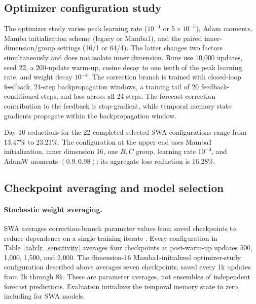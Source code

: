 \documentclass{article}
\begin{document}
\subsection{\texorpdfstring{{Optimizer configuration study}}{Optimizer configuration study}}
\label{app:optimizer_study}
The optimizer study varies peak learning rate ($10^{-4}$ or $5\times10^{-5}$), Adam moments, Mamba initialization scheme (legacy or Mamba1), and the paired inner-dimension/group settings (16/1 or 64/4). The latter changes two factors simultaneously and does not isolate inner dimension. Runs use 10,000 updates, seed 22, a 200-update warm-up, cosine decay to one tenth of the peak learning rate, and weight decay $10^{-4}$. {The correction branch is trained} with closed-loop feedback, 24-step backpropagation windows, a training tail of 20 feedback-conditioned steps, and loss across all 24 steps. {The forecast correction contribution to the feedback} is stop-gradient, while temporal memory state gradients propagate within the backpropagation window.

Day-10 reductions for the 22 completed selected SWA configurations range from $13.47\%$ to $23.21\%$. The configuration at the upper end uses Mamba1 initialization, inner dimension 16, one $B,C$ group, learning rate $10^{-4}$, and AdamW moments $(0.9,0.98)$; its aggregate loss reduction is $16.28\%$.

\subsection{\texorpdfstring{{Checkpoint averaging and model selection}}{Checkpoint averaging and model selection}}
\label{app:checkpoint_selection}
\begin{samepage}
\paragraph{Stochastic weight averaging.}
{SWA averages correction-branch parameter values} from saved checkpoints to reduce dependence on a single training iterate \citep{izmailov2019averagingweightsleadswider}. Every configuration in {Table~\ref{tab:lr_sensitivity}} averages four checkpoints at {post-warm-up updates} 500, 1,000, 1,500, and 2,000. The dimension-16 Mamba1-initialized optimizer-study configuration described above averages seven checkpoints, saved every 1k updates from 2k through 8k. These are parameter averages, not ensembles of independent forecast predictions. {Evaluation initializes the temporal memory state to zero}, including for SWA models.
\end{samepage}
\end{document}
